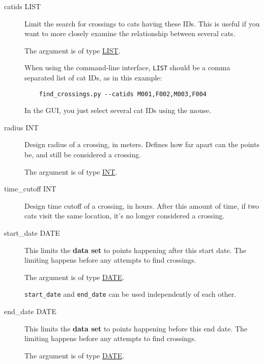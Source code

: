 \begin{description}

\item[catids LIST]
\hypertarget{crossing-catids}{}

Limit the search for crossings to cats having these IDs. This is useful
if you want to more closely examine the relationship between several
cats.

The argument is of type \hyperlink{argument-type-int}{LIST}.

When using the command-line interface, \verb=LIST= should be a comma
separated list of cat IDs, as in this example:

\begin{verbatim}
    find_crossings.py --catids M001,F002,M003,F004
\end{verbatim}

In the GUI, you just select several cat IDs using the mouse.

\item[radius INT]
\hypertarget{crossing-radius}{}

Design radius of a crossing, in meters. Defines how far apart can the
points be, and still be considered a crossing.

The argument is of type \hyperlink{argument-type-int}{INT}.

\item[time\_cutoff INT]
\hypertarget{crossing-time-cutoff}{}

Design time cutoff of a crossing, in hours. After this amount of time,
if two cats visit the same location, it's no longer considered a
crossing.

\item[start\_date DATE]
\hypertarget{crossing-start-date}{}

This limits the \textbf{data set} to points happening after this start
date. The limiting happens before any attempts to find crossings.

The argument is of type \hyperlink{argument-type-date}{DATE}.

\verb=start_date= and \verb=end_date= can be used independently of
each other.

\item[end\_date DATE]
\hypertarget{crossing-end-date}{}

This limits the \textbf{data set} to points happening before this end
date. The limiting happens before any attempts to find crossings.

The argument is of type \hyperlink{argument-type-date}{DATE}.


\end{description}
